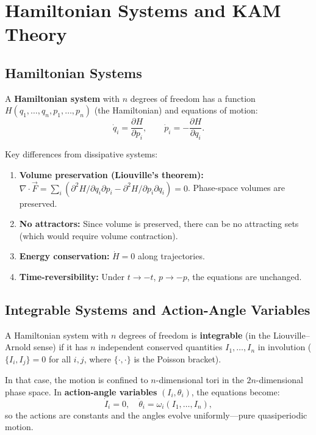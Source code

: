 \documentclass[11pt,letterpaper]{article}
\theoremstyle{definition}
\theoremstyle{plain}
\theoremstyle{remark}
\begin{document}
\section{Hamiltonian Systems and KAM Theory}\label{sec:hamiltonian}

\subsection{Hamiltonian Systems}

A \textbf{Hamiltonian system} with $n$ degrees of freedom has a
function $H(q_1,\ldots,q_n,p_1,\ldots,p_n)$ (the Hamiltonian) and
equations of motion:
\begin{equation}
  \dot{q}_i = \frac{\partial H}{\partial p_i}, \qquad
  \dot{p}_i = -\frac{\partial H}{\partial q_i}.
\end{equation}

Key differences from dissipative systems:
\begin{enumerate}[leftmargin=2em]
  \item \textbf{Volume preservation (Liouville's theorem):}
    $\nabla\cdot\vec{F} = \sum_i(\partial^2 H/\partial q_i\partial p_i
    - \partial^2 H/\partial p_i\partial q_i) = 0$.  Phase-space volumes
    are preserved.
  \item \textbf{No attractors:}  Since volume is preserved, there can be
    no attracting sets (which would require volume contraction).
  \item \textbf{Energy conservation:}  $\dot{H} = 0$ along trajectories.
  \item \textbf{Time-reversibility:}  Under $t\to-t$, $p\to-p$, the
    equations are unchanged.
\end{enumerate}

\subsection{Integrable Systems and Action-Angle Variables}

A Hamiltonian system with $n$ degrees of freedom is \textbf{integrable}
(in the Liouville--Arnold sense) if it has $n$ independent conserved
quantities $I_1,\ldots,I_n$ in involution
($\{I_i,I_j\}=0$ for all $i,j$, where $\{\cdot,\cdot\}$ is the
Poisson bracket).

In that case, the motion is confined to $n$-dimensional tori in the
$2n$-dimensional phase space.  In \textbf{action-angle variables}
$(I_i,\theta_i)$, the equations become:
\[
  \dot{I}_i = 0, \quad \dot{\theta}_i = \omega_i(I_1,\ldots,I_n),
\]
so the actions are constants and the angles evolve uniformly---pure
quasiperiodic motion.
\end{document}
